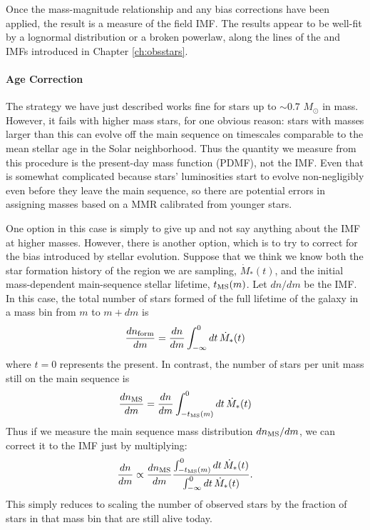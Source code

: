 Once the mass-magnitude relationship and any bias corrections have been applied, the result is a measure of the field IMF. The results appear to be well-fit by a lognormal distribution or a broken powerlaw, along the lines of the \citet{chabrier05a} and \citet{kroupa02c} IMFs introduced in Chapter \ref{ch:obsstars}.

\paragraph{Age Correction}

The strategy we have just described works fine for stars up to $\sim 0.7$ $M_\odot$ in mass. However, it fails with higher mass stars, for one obvious reason: stars with masses larger than this can evolve off the main sequence on timescales comparable to the mean stellar age in the Solar neighborhood. Thus the quantity we measure from this procedure is the present-day mass function (PDMF), not the IMF. Even that is somewhat complicated because stars' luminosities start to evolve non-negligibly even before they leave the main sequence, so there are potential errors in assigning masses based on a MMR calibrated from younger stars.

One option in this case is simply to give up and not say anything about the IMF at higher masses. However, there is another option, which is to try to correct for the bias introduced by stellar evolution. Suppose that we think we know both the star formation history of the region we are sampling, $\dot{M}_*(t)$, and the initial mass-dependent main-sequence stellar lifetime, $t_{\rm MS}(m)$. Let $dn/dm$ be the IMF. In this case, the total number of stars formed of the full lifetime of the galaxy in a mass bin from $m$ to $m+dm$ is
\begin{equation}
\frac{dn_{\rm form}}{dm} =  \frac{dn}{dm} \int_{-\infty}^0 dt \, \dot{M}_*(t)
\end{equation}
where $t=0$ represents the present. In contrast, the number of stars per unit mass still on the main sequence is
\begin{equation}
\frac{dn_{\rm MS}}{dm} = \frac{dn}{dm} \int_{-t_{\rm MS}(m)}^0 dt \, \dot{M}_*(t)
\end{equation}
Thus if we measure the main sequence mass distribution $dn_{\rm MS}/dm$, we can correct it to the IMF just by multiplying:
\begin{equation}
\frac{dn}{dm} \propto \frac{dn_{\rm MS}}{dm} \frac{\int_{-t_{\rm MS}(m)}^0 dt \, \dot{M}_*(t)}{\int_{-\infty}^0 dt \, \dot{M}_*(t)}.
\end{equation}
This simply reduces to scaling the number of observed stars by the fraction of stars in that mass bin that are still alive today.

